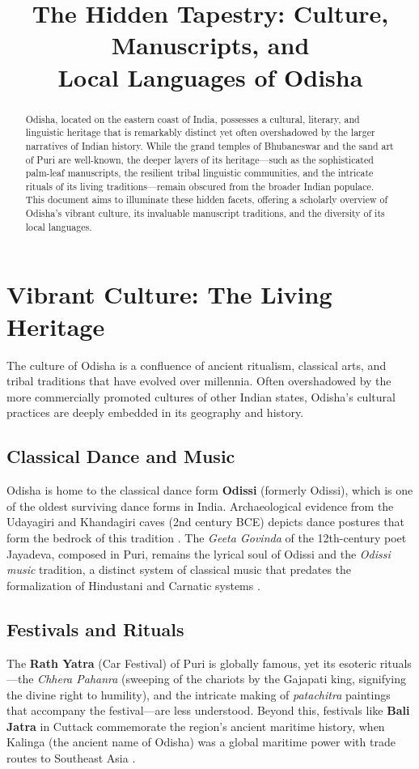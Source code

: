 \documentclass[12pt]{article}
\title{The Hidden Tapestry: Culture, Manuscripts, and \\ Local Languages of Odisha}
\author{}
\date{}
\begin{document}
\maketitle

\begin{abstract}
Odisha, located on the eastern coast of India, possesses a cultural, literary, and linguistic heritage that is remarkably distinct yet often overshadowed by the larger narratives of Indian history. While the grand temples of Bhubaneswar and the sand art of Puri are well-known, the deeper layers of its heritage—such as the sophisticated palm-leaf manuscripts, the resilient tribal linguistic communities, and the intricate rituals of its living traditions—remain obscured from the broader Indian populace. This document aims to illuminate these hidden facets, offering a scholarly overview of Odisha’s vibrant culture, its invaluable manuscript traditions, and the diversity of its local languages.
\end{abstract}

\section{Vibrant Culture: The Living Heritage}
The culture of Odisha is a confluence of ancient ritualism, classical arts, and tribal traditions that have evolved over millennia. Often overshadowed by the more commercially promoted cultures of other Indian states, Odisha’s cultural practices are deeply embedded in its geography and history.

\subsection{Classical Dance and Music}
Odisha is home to the classical dance form \textbf{Odissi} (formerly Odissi), which is one of the oldest surviving dance forms in India. Archaeological evidence from the Udayagiri and Khandagiri caves (2nd century BCE) depicts dance postures that form the bedrock of this tradition \cite{patnaik_odissi}. The \textit{Geeta Govinda} of the 12th-century poet Jayadeva, composed in Puri, remains the lyrical soul of Odissi and the \textit{Odissi music} tradition, a distinct system of classical music that predates the formalization of Hindustani and Carnatic systems \cite{mohapatra_music}.

\subsection{Festivals and Rituals}
The \textbf{Rath Yatra} (Car Festival) of Puri is globally famous, yet its esoteric rituals—the \textit{Chhera Pahanra} (sweeping of the chariots by the Gajapati king, signifying the divine right to humility), and the intricate making of \textit{patachitra} paintings that accompany the festival—are less understood. Beyond this, festivals like \textbf{Bali Jatra} in Cuttack commemorate the region’s ancient maritime history, when Kalinga (the ancient name of Odisha) was a global maritime power with trade routes to Southeast Asia \cite{behera_maritime}.
\end{document}
